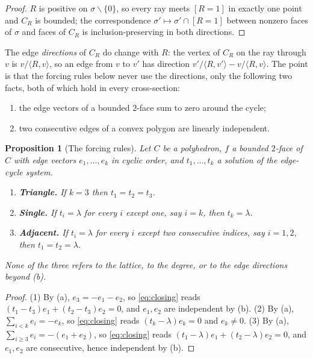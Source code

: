 \documentclass[11pt]{amsart}
\newtheorem{proposition}[theorem]{Proposition}
\theoremstyle{definition}
\theoremstyle{remark}
\theoremstyle{plain}
\begin{document}
\begin{proof}
$R$ is positive on $\sigma \smallsetminus \{0\}$, so every ray meets $[R=1]$ in
exactly one point and $C_R$ is bounded; the correspondence
$\sigma' \mapsto \sigma' \cap [R=1]$ between nonzero faces of $\sigma$ and faces
of $C_R$ is inclusion-preserving in both directions.
\end{proof}

The edge \emph{directions} of $C_R$ do change with $R$: the vertex of $C_R$ on
the ray through $v$ is $v/\langle R,v\rangle$, so an edge from $v$ to $v'$ has
direction $v'/\langle R,v'\rangle - v/\langle R,v\rangle$.  The point is that
the forcing rules below never use the directions, only the following two facts,
both of which hold in every cross-section:
\begin{enumerate}
\item[(a)] the edge vectors of a bounded $2$-face sum to zero around the cycle;
\item[(b)] two consecutive edges of a convex polygon are linearly independent.
\end{enumerate}

\begin{proposition}[The forcing rules]\label{prop:rules}
Let $C$ be a polyhedron, $f$ a bounded $2$-face of $C$ with edge vectors
$e_1,\dots,e_k$ in cyclic order, and $t_1,\dots,t_k$ a solution of the
edge-cycle system.
\begin{enumerate}
\item \textbf{Triangle.} If $k = 3$ then $t_1 = t_2 = t_3$.
\item \textbf{Single.} If $t_i = \lambda$ for every $i$ except one, say $i=k$,
  then $t_k = \lambda$.
\item \textbf{Adjacent.} If $t_i = \lambda$ for every $i$ except two
  \emph{consecutive} indices, say $i = 1, 2$, then $t_1 = t_2 = \lambda$.
\end{enumerate}
None of the three refers to the lattice, to the degree, or to the edge
directions beyond (b).
\end{proposition}

\begin{proof}
(1) By (a), $e_3 = -e_1 - e_2$, so \eqref{eq:closing} reads
$(t_1-t_3)e_1 + (t_2-t_3)e_2 = 0$, and $e_1, e_2$ are independent by (b).
(2) By (a), $\sum_{i<k} e_i = -e_k$, so \eqref{eq:closing} reads
$(t_k - \lambda)e_k = 0$ and $e_k \ne 0$.
(3) By (a), $\sum_{i \ge 3} e_i = -(e_1+e_2)$, so \eqref{eq:closing} reads
$(t_1-\lambda)e_1 + (t_2-\lambda)e_2 = 0$, and $e_1, e_2$ are consecutive,
hence independent by (b).
\end{proof}
\end{document}
